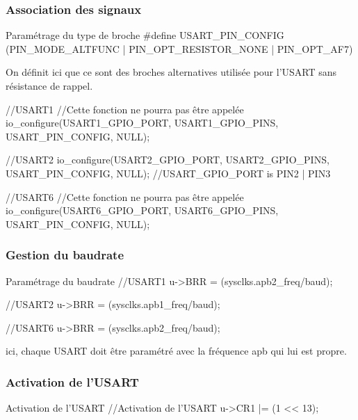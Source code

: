 {



\subsubsection{Association des signaux}

\begin{Cpp}{Paramétrage du type de broche} 
#define USART_PIN_CONFIG (PIN_MODE_ALTFUNC | PIN_OPT_RESISTOR_NONE | PIN_OPT_AF7)
\end{Cpp}



On définit ici que ce sont des broches alternatives utilisée pour l'USART sans résistance de rappel.
\begin{Cpp}{} 
//USART1
//Cette fonction ne pourra pas être appelée
io_configure(USART1_GPIO_PORT, USART1_GPIO_PINS, USART_PIN_CONFIG, NULL);

//USART2
io_configure(USART2_GPIO_PORT, USART2_GPIO_PINS, USART_PIN_CONFIG, NULL);
//USART_GPIO_PORT is PIN2 | PIN3

//USART6
//Cette fonction ne pourra pas être appelée
io_configure(USART6_GPIO_PORT, USART6_GPIO_PINS, USART_PIN_CONFIG, NULL);
\end{Cpp}


\subsubsection{Gestion du baudrate}

\begin{Cpp}{Paramétrage du baudrate}
//USART1
u->BRR = (sysclks.apb2_freq/baud);

//USART2
u->BRR = (sysclks.apb1_freq/baud);

//USART6
u->BRR = (sysclks.apb2_freq/baud);
\end{Cpp}

ici, chaque USART doit être paramétré avec la fréquence apb qui lui est propre.\\


\subsubsection{Activation de l'USART}

\begin{Cpp}{Activation de l'USART}
//Activation de l'USART
u->CR1 |=	(1 << 13);


\end{Cpp}}
